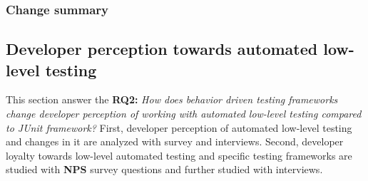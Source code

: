     \begin{table}[H]
            \caption {Unit testing practices and changes in them} \label{tab:junit-pt1}
    \end{table}

\subsubsection{Change summary}

\clearpage


\subsection{Developer perception towards automated low-level testing}
This section answer the
\textbf{RQ2: }\textit{How does behavior driven testing frameworks change developer perception of working with automated low-level
testing compared to JUnit framework?} First, developer perception of automated low-level testing and changes in it are
analyzed with survey and interviews. Second, developer loyalty towards low-level automated testing and specific testing
frameworks are studied with \textbf{NPS} survey questions and further studied with interviews.

